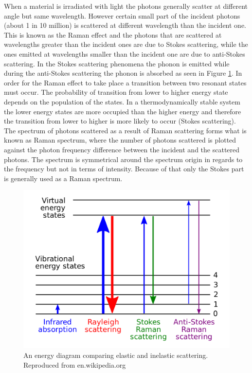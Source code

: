 When a material is irradiated with light the photons generally scatter at different angle but same wavelength. However certain small part of the incident photons (about 1 in 10 million) is scattered at different wavelength than the incident one. This is known as the Raman effect and the photons that are scattered at wavelengths greater than the incident ones are due to Stokes scattering, while the ones emitted at wavelengths smaller than the incident one are due to anti-Stokes scattering. In the Stokes scattering phenomena the phonon is emitted while during the anti-Stokes scattering the phonon is absorbed as seen in Figure \ref{fig:MethodologyRamanEnergyLevels}. In order for the Raman effect to take place a transition between two resonant states must occur. The probability of transition from lower to higher energy state depends on the population of the states. In a thermodynamically stable system the lower energy states are more occupied than the higher energy and therefore the transition from lower to higher is more likely to occur (Stokes scattering). The spectrum of photons scattered as a result of Raman scattering forms what is known as Raman spectrum, where the number of photons scattered is plotted against the photon frequency difference between the incident and the scattered photons. The spectrum is symmetrical around the spectrum origin in regards to the frequency but not in terms of intensity. Because of that only the Stokes part is generally used as a Raman spectrum.

\begin{figure}[!ht]
	\begin{center}
		\includegraphics[scale=0.3]{Methodology/RamanEnergyLevels.png}
		\caption{An energy diagram comparing elastic and inelastic scattering. Reproduced from en.wikipedia.org}
		\label{fig:MethodologyRamanEnergyLevels}
	\end{center}
\end{figure}

